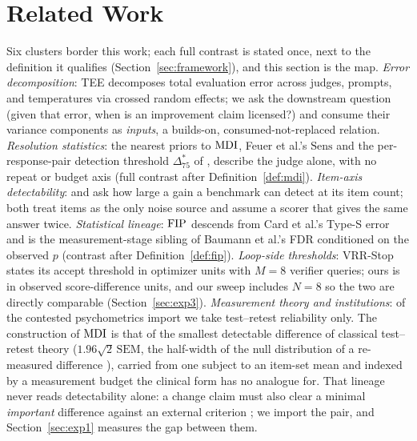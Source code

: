 \section{Related Work}
\label{sec:related}

Six clusters border this work; each full contrast is stated once, next to
the definition it qualifies (Section~\ref{sec:framework}), and this section
is the map. \emph{Error decomposition}: TEE \citep{messing2026tee}
decomposes total evaluation error across judges, prompts, and temperatures
via crossed random effects; we ask the downstream question (given that error, when is an improvement claim
licensed?) and consume their variance components as \emph{inputs}, a builds-on, consumed-not-replaced
relation. \emph{Resolution statistics}: the nearest priors to $\mathrm{MDI}$, Feuer et al.'s $\mathrm{Sens}$
\citep{feuer2025judgmentnoise} and the
per-response-pair detection threshold
$\Delta^*_{75}$ of \citet{usami2026darkcurrent}, describe the judge alone, with no repeat or
budget axis (full contrast after Definition~\ref{def:mdi}).
\emph{Item-axis detectability}: \citet{kotawala2026resolution} and
\citet{zhuang2026preregistering} ask how large a gain a benchmark can detect at
its item count; both treat items as the only noise source and assume a scorer
that gives the same answer twice.
\emph{Statistical lineage}: $\mathrm{FIP}$ descends from Card et al.'s Type-S
error \citep{card2020power} and is the measurement-stage sibling of
Baumann et al.'s FDR conditioned on the observed $p$
\citep{baumann2025llmhacking} (contrast after Definition~\ref{def:fip}).
\emph{Loop-side thresholds}: VRR-Stop \citep{wu2026vrrstop} states its
accept threshold in optimizer units with $M{=}8$ verifier queries; ours is
in observed score-difference units, and our sweep includes $N{=}8$ so the
two are directly comparable (Section~\ref{sec:exp3}). \emph{Measurement theory and institutions}: of
the contested psychometrics import we take test--retest reliability only.
The construction of $\mathrm{MDI}$ is that of the smallest detectable difference of
classical test--retest theory ($1.96\sqrt{2}\,\mathrm{SEM}$, the half-width of
the null distribution of a re-measured difference
\citep{beckerman2001srd, weir2005sem}), carried from one subject to an item-set
mean and indexed by a measurement budget the clinical form has no analogue for.
That lineage never reads detectability alone: a change claim must also
clear a minimal \emph{important} difference against an external criterion
\citep{devet2006minimal, devet2011measurement}; we import the pair, and
Section~\ref{sec:exp1} measures the gap between them.
